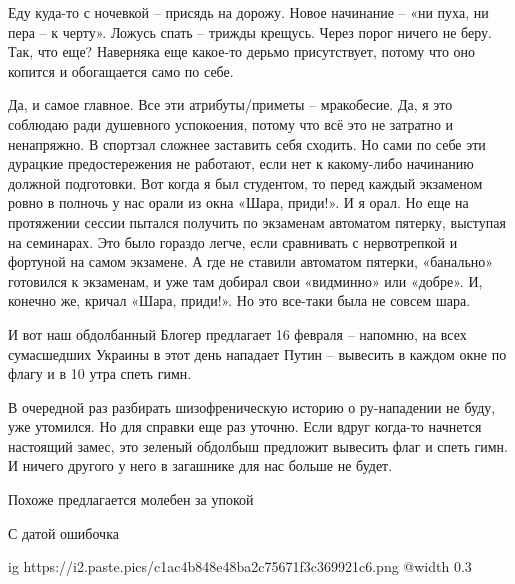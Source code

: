 Еду куда-то с ночевкой – присядь на дорожу. Новое начинание – «ни пуха, ни пера
– к черту». Ложусь спать – трижды крещусь. Через порог ничего не беру. Так, что
еще? Наверняка еще какое-то дерьмо присутствует, потому что оно копится и
обогащается само по себе.

Да, и самое главное. Все эти атрибуты/приметы – мракобесие. Да, я это соблюдаю
ради душевного успокоения, потому что всё это не затратно и ненапряжно. В
спортзал сложнее заставить себя сходить. Но сами по себе эти дурацкие
предостережения не работают, если нет к какому-либо начинанию должной
подготовки. Вот когда я был студентом, то перед каждый экзаменом ровно в
полночь у нас орали из окна «Шара, приди!». И я орал. Но еще на протяжении
сессии пытался получить по экзаменам автоматом пятерку, выступая на семинарах.
Это было гораздо легче, если сравнивать с нервотрепкой и фортуной на самом
экзамене. А где не ставили автоматом пятерки, «банально» готовился к экзаменам,
и уже там добирал свои «видминно» или «добре». И, конечно же, кричал «Шара,
приди!». Но это все-таки была не совсем шара.

И вот наш обдолбанный Блогер предлагает 16 февраля – напомню, на всех
сумасшедших Украины в этот день нападает Путин – вывесить в каждом окне по
флагу и в 10 утра спеть гимн.

В очередной раз разбирать шизофреническую историю о ру-нападении не буду, уже
утомился. Но для справки еще раз уточню. Если вдруг когда-то начнется настоящий
замес, это зеленый обдолбыш предложит вывесить флаг и спеть гимн. И ничего
другого у него в загашнике для нас больше не будет.

\begin{itemize} %

Похоже предлагается молебен за упокой


С датой ошибочка

\ifcmt
  ig https://i2.paste.pics/c1ac4b848e48ba2c75671f3c369921c6.png
  @width 0.3
\fi

\end{itemize} %
